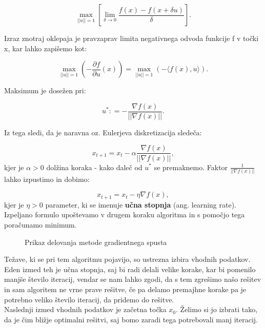 \documentclass{article}
\begin{document}
\[\max_{||u||=1} \left [\lim_{\delta \to 0} \frac{f(x)-f(x+\delta u)}{\delta}\right].\]

\noindent Izraz znotraj oklepaja je pravzaprav limita negativnega odvoda funkcije f v točki x, kar lahko zapišemo kot:

\[\max_{||u||=1} \left (- \frac{\partial f}{\partial u} (x) \right) = \max_{||u||=1} \left (- \langle f(x) , u \rangle \right) .\]

\noindent Maksimum je dosežen pri:

\[ u^* : = - \frac{\nabla f(x)}{||\nabla f(x)||}.\]

\noindent Iz tega sledi, da je naravna oz. Eulerjeva diskretizacija sledeča:

\[ x_{t+1} = x_t - \alpha \frac{\nabla f(x)}{||\nabla f(x)||},\]
kjer je $\alpha > 0$ dolžina koraka - kako daleč od $u^*$ se premaknemo. Faktor $\frac{1}{||\nabla f(x)||}$ lahko izpustimo in dobimo:

\[ x_{t+1} = x_t - \eta {\nabla f(x)},\]
kjer je $\eta > 0$ parameter, ki se imenuje \textbf{učna stopnja} (ang. learning rate).
Izpeljano formulo upoštevamo v drugem koraku algoritma in s pomočjo tega poračunamo minimum.

\begin{figure}[h]
\centering
{}
\caption{Prikaz delovanja metode gradientnega spusta}
\label{fig:foobar}
\end{figure}


\noindent Težave, ki se pri tem algoritmu pojavijo, so ustrezna izbira vhodnih podatkov. Eden izmed teh je učna stopnja, saj bi radi delali velike korake, kar bi pomenilo manjše število iteracij, vendar se nam lahko zgodi, da s tem zgrešimo našo rešitev in sam algoritem ne vrne prave rešitve, če pa delamo premajhne korake pa je potrebno veliko število iteracij, da pridemo do rešitve. \\
Naslednji izmed vhodnih podatkov je začetna točka $x_0$. Želimo si jo izbrati tako, da je čim bližje optimalni rešitvi, saj bomo zaradi tega potrebovali manj iteracij.
\end{document}
